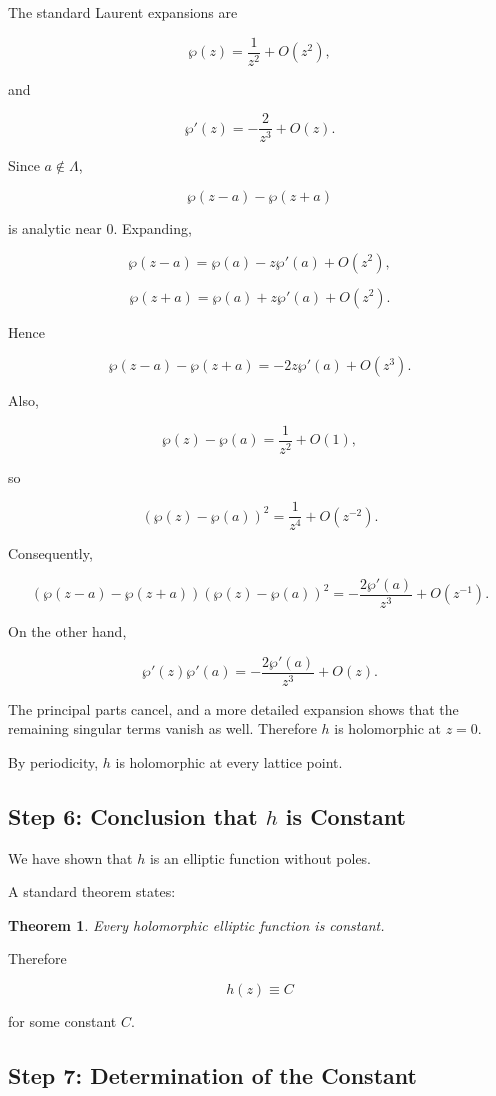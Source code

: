 \documentclass[12pt,a4paper]{article}
\newtheorem{theorem}{Theorem}[section]
\theoremstyle{notespace}
\begin{document}
The standard Laurent expansions are

\[
\wp(z)
=
\frac{1}{z^2}+O(z^2),
\]

and

\[
\wp'(z)
=
-\frac{2}{z^3}+O(z).
\]

Since \(a\notin\Lambda\),

\[
\wp(z-a)-\wp(z+a)
\]

is analytic near \(0\). Expanding,

\[
\wp(z-a)
=
\wp(a)-z\wp'(a)+O(z^2),
\]

\[
\wp(z+a)
=
\wp(a)+z\wp'(a)+O(z^2).
\]

Hence

\[
\wp(z-a)-\wp(z+a)
=
-2z\wp'(a)+O(z^3).
\]

Also,

\[
\wp(z)-\wp(a)
=
\frac{1}{z^2}+O(1),
\]

so

\[
(\wp(z)-\wp(a))^2
=
\frac{1}{z^4}+O(z^{-2}).
\]

Consequently,

\[
(\wp(z-a)-\wp(z+a))
(\wp(z)-\wp(a))^2
=
-\frac{2\wp'(a)}{z^3}
+O(z^{-1}).
\]

On the other hand,

\[
\wp'(z)\wp'(a)
=
-\frac{2\wp'(a)}{z^3}
+O(z).
\]

The principal parts cancel, and a more detailed expansion shows that the remaining singular terms vanish as well. Therefore \(h\) is holomorphic at \(z=0\).

By periodicity, \(h\) is holomorphic at every lattice point.

\subsection{Step 6: Conclusion that \(h\) is Constant}

We have shown that \(h\) is an elliptic function without poles.

A standard theorem states:

\begin{theorem}
	Every holomorphic elliptic function is constant.
\end{theorem}

Therefore

\[
h(z)\equiv C
\]

for some constant \(C\).

\subsection{Step 7: Determination of the Constant}
\end{document}
